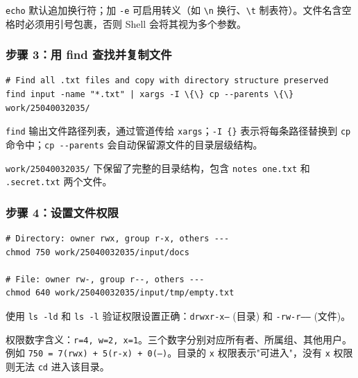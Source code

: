 \documentclass[12pt,a4paper]{article}
\begin{document}
\begin{tipbox}
\texttt{echo} 默认追加换行符；加 \texttt{-e} 可启用转义（如 \texttt{\textbackslash n} 换行、\texttt{\textbackslash t} 制表符）。文件名含空格时必须用引号包裹，否则 Shell 会将其视为多个参数。
\end{tipbox}

\subsubsection{步骤 3：用 find 查找并复制文件}

\begin{lstlisting}[style=shellstyle, caption={Find and copy files}]
# Find all .txt files and copy with directory structure preserved
find input -name "*.txt" | xargs -I \{\} cp --parents \{\} work/25040032035/
\end{lstlisting}

\begin{notebox}
\texttt{find} 输出文件路径列表，通过管道传给 \texttt{xargs}；\texttt{-I \{\}} 表示将每条路径替换到 \texttt{cp} 命令中；\texttt{cp -\/-parents} 会自动保留源文件的目录层级结构。
\end{notebox}

\begin{resultbox}
\texttt{work/25040032035/} 下保留了完整的目录结构，包含 \texttt{notes one.txt} 和 \texttt{.secret.txt} 两个文件。
\end{resultbox}

\subsubsection{步骤 4：设置文件权限}

\begin{lstlisting}[style=shellstyle, caption={Set file permissions}]
# Directory: owner rwx, group r-x, others ---
chmod 750 work/25040032035/input/docs

# File: owner rw-, group r--, others ---
chmod 640 work/25040032035/input/tmp/empty.txt
\end{lstlisting}

\begin{resultbox}
使用 \texttt{ls -ld} 和 \texttt{ls -l} 验证权限设置正确：\texttt{drwxr-x---} (目录) 和 \texttt{-rw-r-----} (文件)。
\end{resultbox}

\begin{tipbox}
权限数字含义：\texttt{r=4, w=2, x=1}。三个数字分别对应所有者、所属组、其他用户。例如 \texttt{750 = 7(rwx) + 5(r-x) + 0(---)}。目录的 \texttt{x} 权限表示"可进入"，没有 \texttt{x} 权限则无法 \texttt{cd} 进入该目录。
\end{tipbox}
\end{document}
